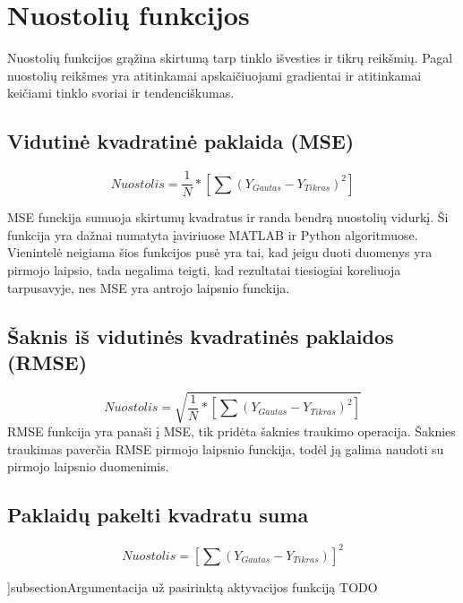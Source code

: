 \documentclass{VUMIFInfKursinis}
\begin{document}



\section{Nuostolių funkcijos}
\par
Nuostolių funkcijos grąžina skirtumą tarp tinklo išvesties ir tikrų reikšmių. Pagal
nuostolių reikšmes yra atitinkamai apskaičiuojami gradientai ir atitinkamai
keičiami tinklo svoriai ir tendenciškumas.

\subsection{Vidutinė kvadratinė paklaida (MSE)}
\[
  Nuostolis = \frac{1}{N} * [\sum(Y_{Gautas}-Y_{Tikras})^{2}]
\]
\par
MSE funckija sumuoja skirtumų kvadratus ir randa bendrą nuostolių vidurkį.
Ši funkcija yra dažnai numatyta įaviriuose MATLAB ir Python algoritmuose.
Vienintelė neigiama šios funkcijos pusė yra tai, kad jeigu duoti duomenys yra pirmojo
laipsio, tada negalima teigti, kad rezultatai tiesiogiai koreliuoja tarpusavyje,
nes MSE yra antrojo laipsnio funckija.

\subsection{Šaknis iš vidutinės kvadratinės paklaidos (RMSE)}
\[
  Nuostolis = \sqrt{\frac{1}{N} * [\sum (Y_{Gautas}-Y_{Tikras})^{2}]}
\]
RMSE funkcija yra panaši į MSE, tik pridėta šaknies traukimo operacija.
Šaknies traukimas paverčia RMSE pirmojo laipsnio funckija, todėl ją galima naudoti
su pirmojo laipsnio duomenimis.

\subsection{Paklaidų pakelti kvadratu suma}
\[
  Nuostolis = [\sum(Y_{Gautas} - Y_{Tikras})]^{2}
\]

]subsection{Argumentacija už pasirinktą aktyvacijos funkciją}
TODO
\end{document}
